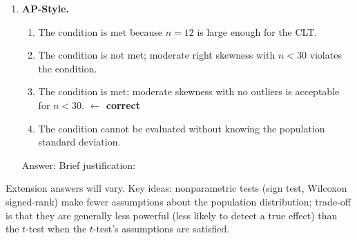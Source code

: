 \documentclass[10pt]{article}
\begin{document}
\begin{enumerate}
\begin{enumerate}[label=\alph*.]
  \item $d_i = $  $-$  \quad; \quad $\mu_d = $ 
  \item Method:  \quad $df = $ 
  \item $H_0$:  \quad $H_a$: 
  \item Conditions:
        \begin{itemize}
          \item Random/Independence: 
          \item Normal ($n < 30$): 
        \end{itemize}
\end{enumerate}

\item \textbf{AP-Style.}

\begin{enumerate}[label=(\Alph*)]
  \item The condition is met because $n = 12$ is large enough for the CLT.
  \item The condition is not met; moderate right skewness with $n < 30$ violates the condition.
  \item The condition is met; moderate skewness with no outliers is acceptable for $n < 30$. \textcolor{keyred}{\textbf{$\leftarrow$ correct}}
  \item The condition cannot be evaluated without knowing the population standard deviation.
\end{enumerate}
Answer:  \quad Brief justification: 

\end{enumerate}

\begin{extensionbox}
Extension answers will vary. Key ideas: nonparametric tests (sign test, Wilcoxon signed-rank)
make fewer assumptions about the population distribution; trade-off is that they are generally
less powerful (less likely to detect a true effect) than the $t$-test when the $t$-test's
assumptions are satisfied.
\end{extensionbox}
\end{document}
